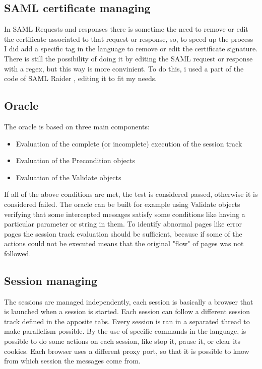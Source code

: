 \subsection{SAML certificate managing}
In SAML Requests and responses there is sometime the need to remove or edit the certificate associated to that request or response, so, to speed up the process I did add a specific tag in the language to remove or edit the certificate signature. There is still the possibility of doing it by editing the SAML request or response with a regex, but this way is more convinient.
To do this, i used a part of the code of SAML Raider \cite{saml_raider}, editing it to fit my needs.

\subsection{Oracle}
The oracle is based on three main components:
\begin{itemize}
    \item Evaluation of the complete (or incomplete) execution of the session track 
    \item Evaluation of the Precondition objects
    \item Evaluation of the Validate objects
\end{itemize}
If all of the above conditions are met, the test is considered passed, otherwise it is considered failed.
The oracle can be built for example using Validate objects verifying that some intercepted messages satisfy some conditions like having a particular parameter or string in them.
To identify abnormal pages like error pages the session track evaluation should be sufficient, because if some of the actions could not be executed means that the original "flow" of pages was not followed.

\subsection{Session managing}
The sessions are managed independently, each session is basically a browser that is launched when a session is started. Each session can follow a different session track defined in the apposite tabs. Every session is ran in a separated thread to make parallelism possible. By the use of specific commands in the language, is possible to do some actions on each session, like stop it, pause it, or clear its cookies. Each browser uses a different proxy port, so that it is possible to know from which session the messages come from.




